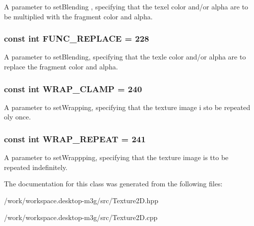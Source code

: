 A parameter to setBlending , specifying that the texel color and/or alpha are to be multiplied with the fragment color and alpha. \hypertarget{classm3g_1_1Texture2D_14f24332e168c5e210ddad47fb5cdd17}{
\subsubsection[{FUNC\_\-REPLACE}]{\setlength{\rightskip}{0pt plus 5cm}const int {\bf FUNC\_\-REPLACE} = 228}}
\label{classm3g_1_1Texture2D_14f24332e168c5e210ddad47fb5cdd17}


A parameter to setBlending, specifying that the texle color and/or alpha are to replace the fragment color and alpha. \hypertarget{classm3g_1_1Texture2D_e36d8facf5b60eb6c59888121731c438}{
\subsubsection[{WRAP\_\-CLAMP}]{\setlength{\rightskip}{0pt plus 5cm}const int {\bf WRAP\_\-CLAMP} = 240}}
\label{classm3g_1_1Texture2D_e36d8facf5b60eb6c59888121731c438}


A parameter to setWrapping, specifying that the texture image i sto be repeated oly once. \hypertarget{classm3g_1_1Texture2D_b37ff061b9fb272284c4c389deec9266}{
\subsubsection[{WRAP\_\-REPEAT}]{\setlength{\rightskip}{0pt plus 5cm}const int {\bf WRAP\_\-REPEAT} = 241}}
\label{classm3g_1_1Texture2D_b37ff061b9fb272284c4c389deec9266}


A parameter to setWrappping, specifying that the texture image is tto be repeated indefinitely. 

The documentation for this class was generated from the following files:\begin{CompactItemize}
\item 
/work/workspace.desktop-m3g/src/Texture2D.hpp\item 
/work/workspace.desktop-m3g/src/Texture2D.cpp\end{CompactItemize}
